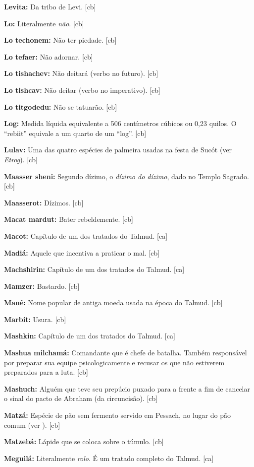 \textbf{Levita:} Da tribo de Levi. [cb]

\textbf{Lo:} Literalmente \emph{não}. [cb]

\textbf{Lo techonem:} Não ter piedade. [cb]

\textbf{Lo tefaer:} Não adornar. [cb]

\textbf{Lo tishachev:} Não deitará (verbo no futuro). [cb]

\textbf{Lo tishcav:} Não deitar (verbo no imperativo). [cb]

\textbf{Lo titgodedu:} Não se tatuarão. [cb]

\textbf{Log:} Medida líquida equivalente a 506 centímetros cúbicos ou 0,23 quilos. O ``rebiit'' equivale a um quarto de um ``log''. [cb]

\textbf{Lulav:} Uma das quatro espécies de palmeira usadas na festa de
Sucót (ver \emph{Etrog}). [cb]

\textbf{Maasser sheni:} Segundo dízimo, o \emph{dízimo do dízimo}, dado no
Templo Sagrado. [cb]

\textbf{Maasserot:} Dízimos. [cb]

\textbf{Macat mardut:} Bater rebeldemente. [cb]

\textbf{Macot:} Capítulo de um dos tratados do Talmud. [ca]

\textbf{Madiá:} Aquele que incentiva a praticar o mal. [cb]

\textbf{Machshirin:} Capítulo de um dos tratados do Talmud. [ca]

\textbf{Mamzer:} Bastardo. [cb]

\textbf{Manê:} Nome popular de antiga moeda usada na época do Talmud. [cb]

\textbf{Marbit:} Usura. [cb]

\textbf{Mashkin:} Capítulo de um dos tratados do Talmud. [ca]

\textbf{Mashua milchamá:} Comandante que é chefe de
batalha. Também responsável por preparar sua equipe
psicologicamente e recusar os que não estiverem preparados para a
luta. [cb]

\textbf{Mashuch:} Alguém que teve seu prepúcio puxado para a
frente a fim de cancelar o sinal do pacto de Abraham (da circuncisão). [cb]

\textbf{Matzá:} Espécie de pão sem fermento servido em Pessach, no lugar do pão
comum (ver ). [cb]

\textbf{Matzebá:} Lápide que se coloca sobre o túmulo. [cb]

\textbf{Meguilá:} Literalmente \emph{rolo}. É um tratado completo do Talmud. [ca]

